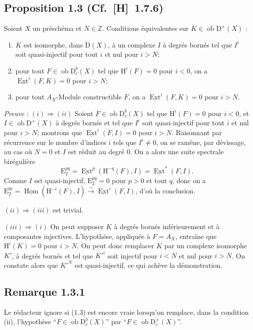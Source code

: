 \documentclass[11pt]{article}
\renewcommand{\H}{\mathrm{H}}
\DeclareMathOperator{\Hom}{Hom}
\DeclareMathOperator{\Ext}{Ext}
\newcommand{\D}{\mathrm{D}}
\newcommand{\Z}{\mathbb{Z}}
\newcommand{\E}{\mathrm{E}}
\newcommand{\ob}{\operatorname{ob}}
\providecommand{\Hom}{\operatorname{Hom}}
\providecommand{\ob}{\operatorname{ob}}
\providecommand{\Z}{\mathbb Z}
\providecommand{\Hom}{\operatorname{Hom}}
\begin{document}
\subsection*{Proposition 1.3 {\normalfont (Cf.~[H]~1.7.6)}}
Soient $X$ un préschéma et $N \in \Z$. Conditions équivalentes sur $K \in \ob \D^{+}(X)$ :
\begin{enumerate}[label=(\roman*)]
\item $K$ est isomorphe, dans $\D(X)$, à un complexe $I$ à degrés bornés tel que $I^i$ soit quasi-injectif pour tout $i$ et nul pour $i > N$;
\item pour tout $F \in \ob \D_c^{b}(X)$ tel que $\H^i(F) = 0$ pour $i < 0$, on a $\underline{\Ext}^i(F,K) = 0$ pour $i > N$;
\item pour tout $A_X$-Module constructible $F$, on a $\underline{\Ext}^i(F,K) = 0$ pour $i > N$.
\end{enumerate}

\emph{Preuve} : $(i) \Rightarrow (ii)$ Soient $F \in \ob \D_c^{b}(X)$ tel que $\H^i(F) = 0$ pour $i < 0$, et $I \in \ob \D^{+}(X)$ à degrés bornés et tel que $I^i$ soit quasi-injectif pour tout $i$ et nul pour $i > N$; montrons que $\underline{\Ext}^i(F,I) = 0$ pour $i > N$. Raisonnant par récurrence sur le nombre d'indices $i$ tels que $I^i \neq 0$, on se ramène, par dévissage, au cas où $N = 0$ et $I$ est réduit au degré $0$. On a alors une suite spectrale birégulière
\[
\E_2^{pq} = \underline{\Ext}^p(\H^{-q}(F),I) = \underline{\Ext}^{*}(F,I).
\]
Comme $I$ est quasi-injectif, $\E_2^{pq} = 0$ pour $p > 0$ et tout $q$, donc on a $\E_2^{0i} = \underline{\Hom}(\H^{-i}(F),I) \xrightarrow{\sim} \underline{\Ext}^i(F,I)$, d'où la conclusion.

$(ii) \Rightarrow (iii)$ est trivial.

$(iii) \Rightarrow (i)$ On peut supposer $K$ à degrés bornés inférieurement et à
composantes injectives. L'hypothèse, appliquée à $F = A_X$, entraîne que $\H^i(K) = 0$ pour $i > N$. On peut donc remplacer $K$ par un complexe isomorphe $K'$, à degrés bornés et tel que $K'^i$ soit injectif pour $i < N$ et nul pour $i > N$. On constate alors que $K'^N$ est quasi-injectif, ce qui achève la démonstration.

\subsection*{Remarque 1.3.1}
Le rédacteur ignore si (1.3) est encore vraie lorsqu'on remplace, dans la condition (ii), l'hypothèse ``$F \in \ob \D_c^{b}(X)$'' par ``$F \in \ob \D_c^{+}(X)$''.
\end{document}
